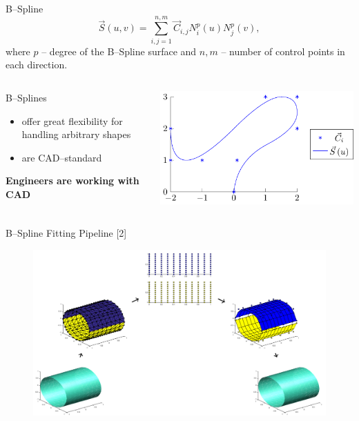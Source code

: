 \begin{frame}{B--Spline}
\begin{equation*}
\vec{S}\left(u,v\right)=\sum\limits_{i,j=1}^{n,m} \vec{C}_{i,j} N_i^p\left(u\right) N_j^p\left(v\right),
\end{equation*}
where $p$ -- degree of the B--Spline surface and $n,m$ -- number of control points in each direction.
\begin{columns}
\begin{column}{.45\textwidth}
B--Splines
\begin{itemize}
\item offer great flexibility for handling arbitrary shapes
\item are CAD--standard
\end{itemize}
\textbf{Engineers are working with CAD}
\end{column}
\begin{column}{.45\textwidth}
\includegraphics[width=\textwidth]{Pictures/BSplineEx/example.pdf}
\end{column}
\end{columns}
\end{frame}
\begin{frame}{B--Spline Fitting Pipeline [2]}
\begin{figure}
\includegraphics[scale=0.25]{Pictures/NURBS/TheArc.png}
\end{figure}
        
\end{frame}


